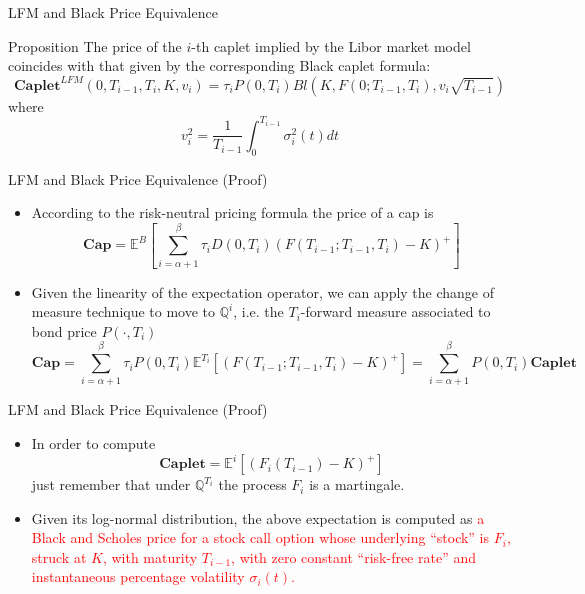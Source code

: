 \documentclass{beamer}
\begin{document}
\begin{frame}{LFM and Black Price Equivalence}
	\begin{block}{Proposition}
		The price of the $i$-th caplet implied by the Libor market model coincides with that given by the corresponding Black caplet formula:
		\begin{equation}
			\textbf{Caplet}^{LFM}(0, T_{i-1}, T_i, K, v_i)= \tau_i P(0, T_i) Bl(K, F(0; T_{i-1}, T_i), v_i\sqrt{T_{i-1}})
		\end{equation}
		where
		\begin{equation}
			v_i^2 = \frac{1}{T_{i-1}}\int_0^{T_{i-1}}\sigma_i^2(t)dt
			\label{eq:caplet_black_vol}
		\end{equation}
	\end{block}
\end{frame}

\begin{frame}{LFM and Black Price Equivalence (Proof)}
	\begin{itemize}
	\item<1-> According to the risk-neutral pricing formula the price of a cap is 
	\begin{equation*}
		\textbf{Cap}=\mathbb{E}^B\left[\sum_{i=\alpha+1}^\beta 	\tau_iD(0, T_i)(F(T_{i-1}; T_{i-1}, T_i) - K)^+\right]
	\end{equation*}
	\item<2-> Given the linearity of the expectation operator, we can apply the change of measure technique to move to $\mathbb{Q}^i$, i.e. the $T_i$-forward measure associated to bond price $P(\cdot,T_i)$
	\begin{equation*}
		\textbf{Cap}= \sum_{i=\alpha+1}^\beta \tau_i P(0, T_i)\mathbb{E}^{T_i}[(F(T_{i-1}; T_{i-1}, T_i) - K)^+] = \sum_{i=\alpha+1}^\beta P(0, T_i)\textbf{Caplet}
	\end{equation*}
	\end{itemize}
\end{frame}

\begin{frame}{LFM and Black Price Equivalence (Proof)}
	\begin{itemize}
	\item In order to compute 
	\begin{equation*}
		\textbf{Caplet} = \mathbb{E}^i[(F_i(T_{i-1}) - K)^+]
	\end{equation*}
	just remember that under $\mathbb{Q}^{T_i}$ the process $F_i$ is a martingale.
	\item Given its log-normal distribution, the above expectation is computed as \textcolor{red}{a Black and Scholes price for a stock call option whose underlying “stock” is $F_i$, struck at $K$, with maturity $T_{i-1}$, with zero constant “risk-free rate” and instantaneous percentage volatility $\sigma_i(t)$.}
\end{itemize}
\end{frame}
\end{document}
